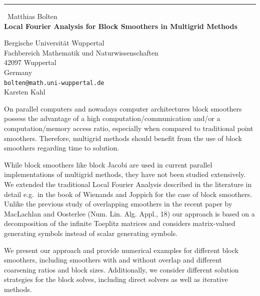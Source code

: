 \documentclass{report}
\begin{document}
\begin{center}
\rule{6in}{1pt} \
{\large Matthias Bolten \\
{\bf Local {Fourier} Analysis for Block Smoothers in Multigrid Methods}}

Bergische Universit\"at Wuppertal \\ Fachbereich Mathematik und Naturwissenschaften \\ 42097 Wuppertal \\ Germany
\\
{\tt bolten@math.uni-wuppertal.de}\\
Karsten Kahl\end{center}


On parallel computers and nowadays computer architectures block smoothers
possess the advantage of a high computation/communication and/or a
computation/memory access ratio, especially when compared to traditional
point smoothers. Therefore, multigrid methods should benefit from the use
of block smoothers regarding time to solution.

While block smoothers like block Jacobi are used in current parallel
implementations of multigrid methods, they have not been studied
extensively. We extended the traditional Local {Fourier} Analysis
described in the literature in detail e.g.~in the book of Wienands and
Joppich for the case of block smoothers. Unlike the previous study of
overlapping smoothers in the recent paper by MacLachlan and Oosterlee
(Num. Lin. Alg. Appl., 18) our approach is based on a decomposition of
the infinite Toeplitz matrices and considers matrix-valued generating
symbols instead of scalar generating symbols.

We present our approach and provide numerical examples for different
block smoothers, including smoothers with and without overlap and
different coarsening ratios and block sizes. Additionally, we consider
different solution strategies for the block solves, including direct
solvers as well as iterative methods.
\end{document}
